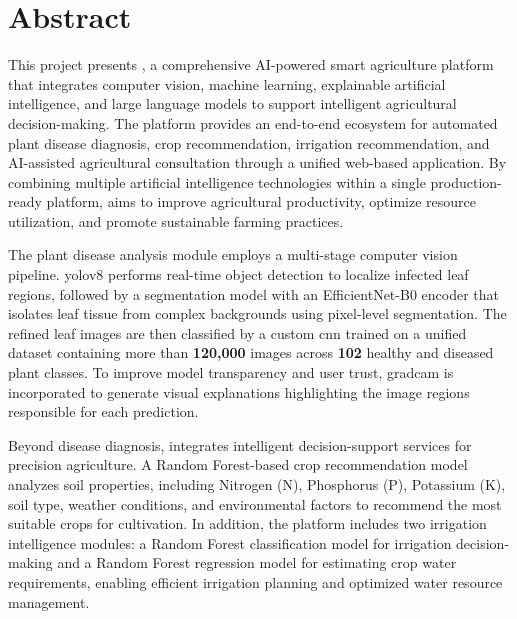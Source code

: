 
\chapter*{Abstract}

\noindent
This project presents \nabta, a comprehensive AI-powered smart agriculture platform that integrates computer vision, machine learning, explainable artificial intelligence, and large language models to support intelligent agricultural decision-making. The platform provides an end-to-end ecosystem for automated plant disease diagnosis, crop recommendation, irrigation recommendation, and AI-assisted agricultural consultation through a unified web-based application. By combining multiple artificial intelligence technologies within a single production-ready platform, \nabta aims to improve agricultural productivity, optimize resource utilization, and promote sustainable farming practices.

The plant disease analysis module employs a multi-stage computer vision pipeline. \gls{yolov8} performs real-time object detection to localize infected leaf regions, followed by a \unet segmentation model with an EfficientNet-B0 encoder that isolates leaf tissue from complex backgrounds using pixel-level segmentation. The refined leaf images are then classified by a custom \gls{cnn} trained on a unified dataset containing more than \textbf{120,000} images across \textbf{102} healthy and diseased plant classes. To improve model transparency and user trust, \gls{gradcam} is incorporated to generate visual explanations highlighting the image regions responsible for each prediction.

Beyond disease diagnosis, \nabta integrates intelligent decision-support services for precision agriculture. A Random Forest-based crop recommendation model analyzes soil properties, including Nitrogen (N), Phosphorus (P), Potassium (K), soil type, weather conditions, and environmental factors to recommend the most suitable crops for cultivation. In addition, the platform includes two irrigation intelligence modules: a Random Forest classification model for irrigation decision-making and a Random Forest regression model for estimating crop water requirements, enabling efficient irrigation planning and optimized water resource management.

